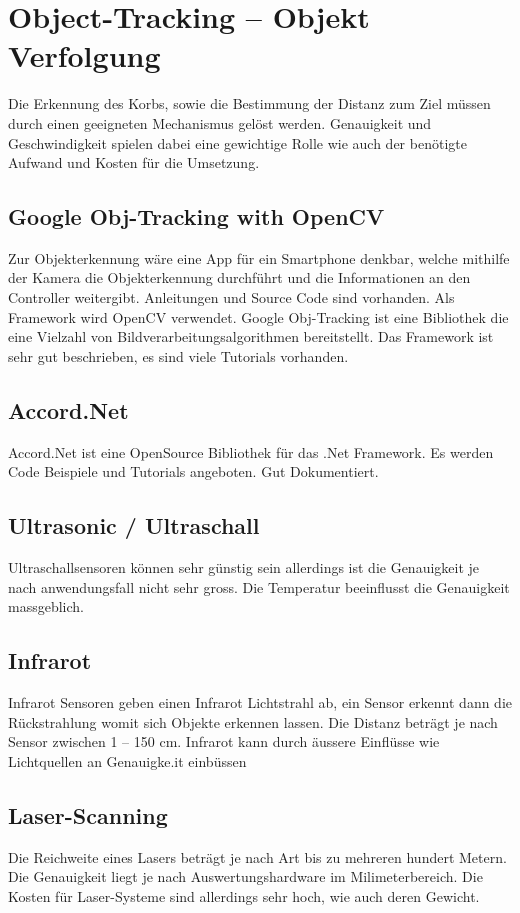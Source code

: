 ﻿\section{Object-Tracking – Objekt Verfolgung}
Die Erkennung des Korbs, sowie die Bestimmung der Distanz zum Ziel müssen durch einen geeigneten Mechanismus gelöst werden. Genauigkeit und Geschwindigkeit spielen dabei eine gewichtige Rolle wie auch der benötigte Aufwand und Kosten für die Umsetzung.

\subsection{Google Obj-Tracking with OpenCV}
Zur Objekterkennung wäre eine App für ein Smartphone denkbar, welche mithilfe der Kamera die Objekterkennung durchführt und die Informationen an den Controller weitergibt. Anleitungen und Source Code sind vorhanden. Als Framework wird OpenCV verwendet. Google Obj-Tracking ist eine Bibliothek die eine Vielzahl von Bildverarbeitungsalgorithmen bereitstellt. Das Framework ist sehr gut beschrieben, es sind viele Tutorials vorhanden.

\subsection{Accord.Net}
Accord.Net ist eine OpenSource Bibliothek für das .Net Framework. Es werden Code Beispiele und Tutorials angeboten. Gut Dokumentiert.

\subsection{Ultrasonic / Ultraschall }
Ultraschallsensoren können sehr günstig sein allerdings ist die Genauigkeit je nach anwendungsfall nicht sehr gross. Die Temperatur beeinflusst die Genauigkeit massgeblich. 

\subsection{Infrarot}
Infrarot Sensoren geben einen Infrarot Lichtstrahl ab, ein Sensor erkennt dann die Rückstrahlung womit sich Objekte erkennen lassen. Die Distanz beträgt je nach Sensor zwischen 1 – 150 cm. Infrarot kann durch äussere Einflüsse wie Lichtquellen an Genauigke.it einbüssen

\subsection{Laser-Scanning}
Die Reichweite eines Lasers beträgt je nach Art bis zu mehreren hundert Metern. Die Genauigkeit liegt je nach Auswertungshardware im Milimeterbereich. Die Kosten für Laser-Systeme sind allerdings sehr hoch, wie auch deren Gewicht.


